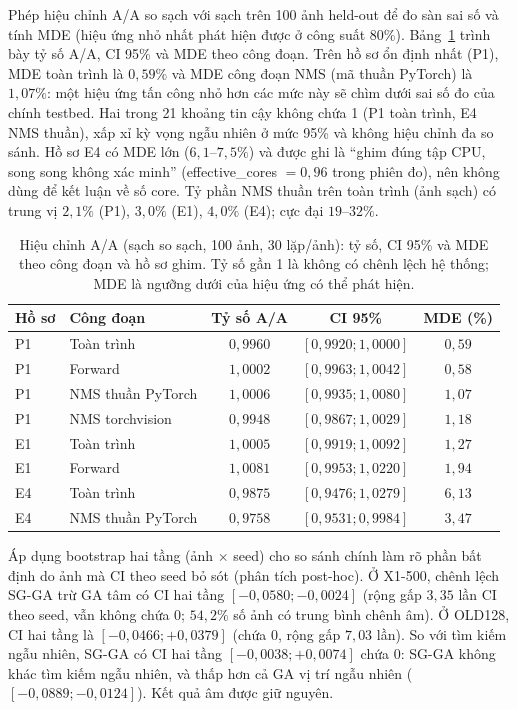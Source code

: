 \documentclass[a4paper,fleqn]{cas-dc}
\begin{document}
Phép hiệu chỉnh A/A so sạch với sạch trên 100 ảnh held-out để đo sàn sai số và tính MDE (hiệu ứng nhỏ nhất phát hiện được ở công suất 80\%). Bảng~\ref{tab:aa} trình bày tỷ số A/A, CI 95\% và MDE theo công đoạn. Trên hồ sơ ổn định nhất (P1), MDE toàn trình là $0{,}59\%$ và MDE công đoạn NMS (mã thuần PyTorch) là $1{,}07\%$: một hiệu ứng tấn công nhỏ hơn các mức này sẽ chìm dưới sai số đo của chính testbed. Hai trong 21 khoảng tin cậy không chứa 1 (P1 toàn trình, E4 NMS thuần), xấp xỉ kỳ vọng ngẫu nhiên ở mức 95\% và không hiệu chỉnh đa so sánh. Hồ sơ E4 có MDE lớn ($6{,}1$--$7{,}5\%$) và được ghi là ``ghim đúng tập CPU, song song không xác minh'' (effective\_cores $=0{,}96$ trong phiên đo), nên không dùng để kết luận về số core. Tỷ phần NMS thuần trên toàn trình (ảnh sạch) có trung vị $2{,}1\%$ (P1), $3{,}0\%$ (E1), $4{,}0\%$ (E4); cực đại $19$--$32\%$.

\begin{table}[t]
\centering
\small
\caption{Hiệu chỉnh A/A (sạch so sạch, 100 ảnh, 30 lặp/ảnh): tỷ số, CI 95\% và MDE theo công đoạn và hồ sơ ghim. Tỷ số gần 1 là không có chênh lệch hệ thống; MDE là ngưỡng dưới của hiệu ứng có thể phát hiện.}
\begin{tabularx}{\textwidth}{@{}l l c c c@{}}
\toprule
\textbf{Hồ sơ} & \textbf{Công đoạn} & \textbf{Tỷ số A/A} & \textbf{CI 95\%} & \textbf{MDE (\%)} \\
\midrule
P1 & Toàn trình        & $0{,}9960$ & $[0{,}9920;1{,}0000]$ & $0{,}59$ \\
P1 & Forward           & $1{,}0002$ & $[0{,}9963;1{,}0042]$ & $0{,}58$ \\
P1 & NMS thuần PyTorch & $1{,}0006$ & $[0{,}9935;1{,}0080]$ & $1{,}07$ \\
P1 & NMS torchvision   & $0{,}9948$ & $[0{,}9867;1{,}0029]$ & $1{,}18$ \\
E1 & Toàn trình        & $1{,}0005$ & $[0{,}9919;1{,}0092]$ & $1{,}27$ \\
E1 & Forward           & $1{,}0081$ & $[0{,}9953;1{,}0220]$ & $1{,}94$ \\
E4 & Toàn trình        & $0{,}9875$ & $[0{,}9476;1{,}0279]$ & $6{,}13$ \\
E4 & NMS thuần PyTorch & $0{,}9758$ & $[0{,}9531;0{,}9984]$ & $3{,}47$ \\
\bottomrule
\end{tabularx}
\label{tab:aa}
\end{table}

Áp dụng bootstrap hai tầng (ảnh $\times$ seed) cho so sánh chính làm rõ phần bất định do ảnh mà CI theo seed bỏ sót (phân tích post-hoc). Ở X1-500, chênh lệch SG-GA trừ GA tâm có CI hai tầng $[-0{,}0580;-0{,}0024]$ (rộng gấp $3{,}35$ lần CI theo seed, vẫn không chứa 0; $54{,}2\%$ số ảnh có trung bình chênh âm). Ở OLD128, CI hai tầng là $[-0{,}0466;+0{,}0379]$ (chứa 0, rộng gấp $7{,}03$ lần). So với tìm kiếm ngẫu nhiên, SG-GA có CI hai tầng $[-0{,}0038;+0{,}0074]$ chứa 0: SG-GA không khác tìm kiếm ngẫu nhiên, và thấp hơn cả GA vị trí ngẫu nhiên ($[-0{,}0889;-0{,}0124]$). Kết quả âm được giữ nguyên.
\end{document}
